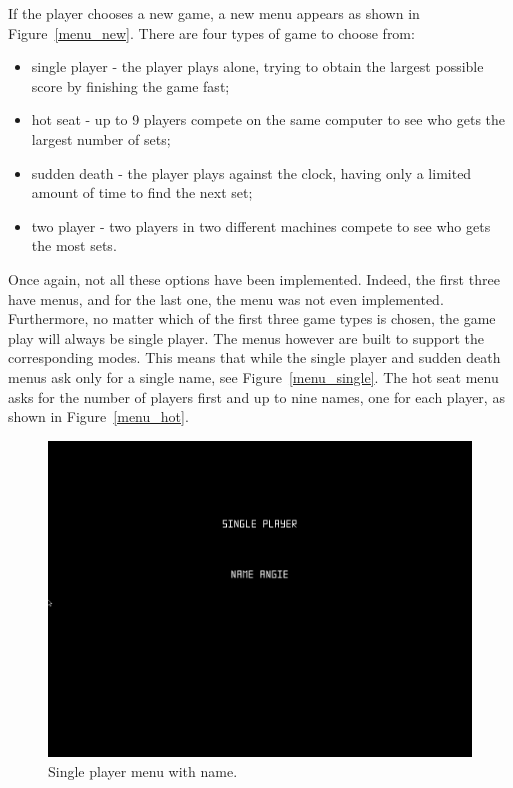 \documentclass[11pt,a4paper,reqno]{report}
\numberwithin{equation}{section}
\begin{document}
If the player chooses a new game, a new menu appears as shown in Figure~\ref{menu_new}. There are four types of game to choose from:
\begin{itemize}
\item single player - the player plays alone, trying to obtain the largest possible score by finishing the game fast;
\item hot seat - up to 9 players compete on the same computer to see who gets the largest number of sets;
\item sudden death - the player plays against the clock, having only a limited amount of time to find the next set;
\item two player - two players in two different machines compete to see who gets the most sets.
\end{itemize}

Once again, not all these options have been implemented. Indeed, the first three have menus, and for the last one, the menu was not even implemented. Furthermore, no matter which of the first three game types is chosen, the game play will always be single player. The menus however are built to support the corresponding modes. This means that while the single player and sudden death menus ask only for a single name, see Figure~\ref{menu_single}. The hot seat menu asks for the number of players first and up to nine names, one for each player, as shown in Figure~\ref{menu_hot}.

\begin{figure}[htbp]
\begin{center}
\includegraphics[scale=0.3]{menu_single_name.png}
\caption{Single player menu with name.}
\label{menu_single_name}
\end{center}
\end{figure}
\end{document}
